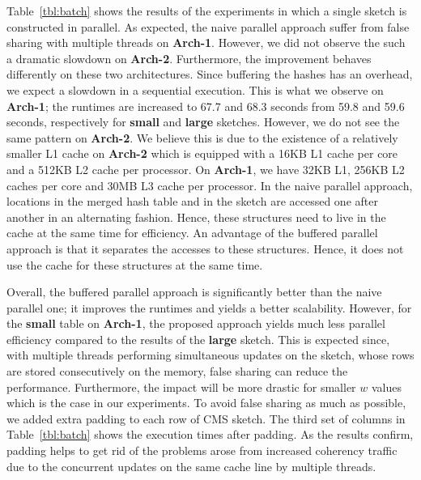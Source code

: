 \documentclass[10pt, conference, compsocconf]{IEEEtran}
\begin{document}
Table~\ref{tbl:batch} shows the results of the experiments in which a single sketch is constructed in parallel. As expected, the naive parallel approach suffer from false sharing with multiple threads on {\bf Arch-1}. However, we did not observe the such a dramatic slowdown on {\bf Arch-2}. Furthermore, the improvement behaves differently on these two architectures. Since buffering the hashes has an overhead, we expect a slowdown in a sequential execution. This is what we observe on {\bf Arch-1}; the runtimes are increased to  67.7 and 68.3 seconds from 59.8 and
 59.6 seconds, respectively for {\bf small} and {\bf large} sketches. However, we do not see the same pattern on {\bf Arch-2}.
We believe this is due to the existence of a relatively smaller L1 cache on {\bf Arch-2} which is equipped with a 16KB L1 cache per core and a 512KB L2 cache per processor. On {\bf Arch-1}, we have 32KB L1, 256KB L2 caches per core and 30MB L3 cache per processor. In the naive parallel approach, locations in the merged hash table and in the sketch are accessed one after another in an alternating fashion. Hence, these structures need to live in the cache at the same time for efficiency. An advantage of the buffered parallel approach is that it separates the accesses to these structures. Hence, it does not use the cache for these structures at the same time. 

Overall, the buffered parallel approach is significantly better than the naive parallel one; it improves the runtimes and yields a better scalability. However, for the {\bf small} table on {\bf Arch-1}, the proposed approach yields much less parallel efficiency compared to the results of the {\bf large} sketch. This is expected since, with multiple threads performing simultaneous updates on the sketch, whose rows are stored consecutively on the memory, false sharing can reduce the performance. Furthermore, the impact will be more drastic for smaller $w$ values which is the case in our experiments. To avoid false sharing as much as possible, we added extra padding to each row of CMS sketch. The third set of columns in Table~\ref{tbl:batch} shows the execution times after padding. As the results confirm, padding helps to get rid of the problems arose from increased coherency traffic due to the concurrent updates on the same cache line by multiple threads. 
\end{document}
